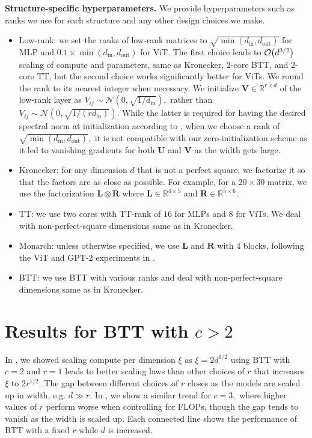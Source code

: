 \documentclass{article}
\newcommand{\mbf}[1]{{\boldsymbol{\mathbf{#1}}}}
\newcommand{\bm}{\mbf}
\theoremstyle{plain}
\theoremstyle{definition}
\theoremstyle{remark}
\newcommand{\R}{\mathbb{R}}
\newcommand{\din}{{d_\mathrm{in}}}
\newcommand{\dout}{{d_\mathrm{out}}}
\begin{document}
\noindent \textbf{Structure-specific hyperparameters.} \quad
We provide hyperparameters such as ranks we use for each structure and any other design choices we make.
\begin{itemize}
    \item Low-rank: we set the ranks of low-rank matrices to $\sqrt{\min(\din, \dout)}$ for MLP and $0.1 \times \min(\din, \dout)$ for ViT. The first choice leads to $\order{d^{3/2}}$ scaling of compute and parameters, same as Kronecker, 2-core BTT, and 2-core TT, but the second choice works significantly better for ViTs. We round the rank to its nearest integer when necessary. We initialize $\bm{V} \in \R^{r \times d}$ of the low-rank layer as $V_{ij} \sim \mathcal{N}(0, \sqrt{1/\din}), $ rather than $V_{ij} \sim \mathcal{N}(0, \sqrt{1/(r\din)}).$ While the latter is required for having the desired spectral norm at initialization according to , when we choose a rank of $\sqrt{\min(\din, \dout)},$ it is not compatible with our zero-initialization scheme as it led to vanishing gradients for both $\bm{U}$ and $\bm{V}$ as the width gets large.
    \item Kronecker: for any dimension $d$ that is not a perfect square, we factorize it so that the factors are as close as possible. For example, for a $20 \times 30$ matrix, we use the factorization $\bm{L} \otimes \bm{R}$ where $\bm{L} \in \R^{4 \times 5}$ and $\bm{R} \in \R^{5 \times 6}.$
    \item TT: we use two cores with TT-rank of $16$ for MLPs and $8$ for ViTs. We deal with non-perfect-square dimensions same as in Kronecker.
    \item Monarch: unless otherwise specified, we use $\bm{L}$ and $\bm{R}$ with 4 blocks, following the ViT and GPT-2 experiments in \citet{dao2022monarch}.
    \item BTT: we use BTT with various ranks and deal with non-perfect-square dimensions same as in Kronecker.
\end{itemize}



\section{Results for BTT with $c > 2$} \label{app:more-cores}
In , we showed scaling compute per dimension $\xi$ as $\xi=2d^{1/2}$ using BTT with $c=2$ and $r=1$ leads to better scaling laws than other choices of $r$ that increases $\xi$ to $2r^{1/2}.$ The gap between different choices of $r$ closes as the models are scaled up in width, e.g. $d \gg r.$
In , we show a similar trend for $c=3,$ where higher values of $r$ perform worse when controlling for FLOPs, though the gap tends to vanish as the width is scaled up. Each connected line shows the performance of BTT with a fixed $r$ while $d$ is increased.
\end{document}
